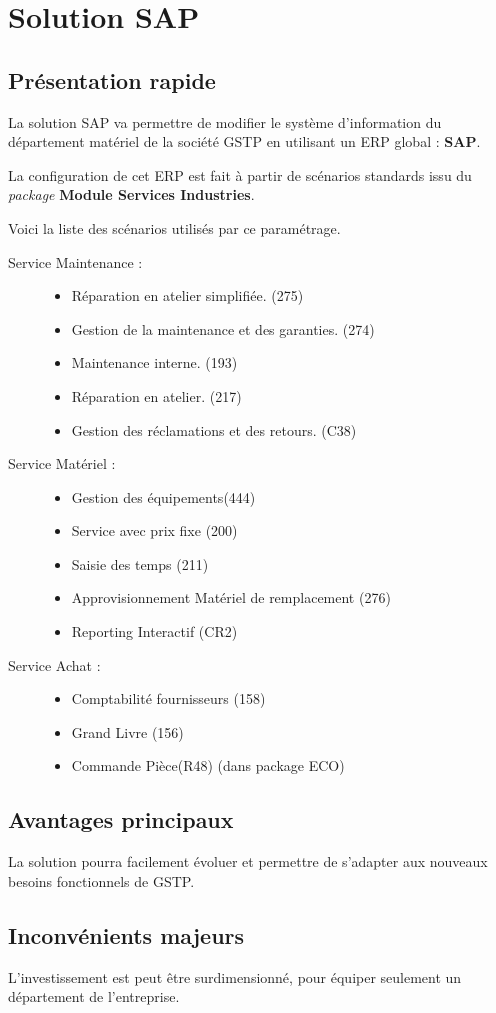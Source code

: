 \section{Solution SAP}

\subsection{Présentation rapide}

La solution SAP va permettre de modifier le système d'information du département
matériel de la société GSTP en utilisant un ERP global : {\bf SAP}.

La configuration de cet ERP est fait à partir de scénarios standards issu du {\sl package}
{\bf Module Services Industries}.

Voici la liste des scénarios utilisés par ce paramétrage.

\begin{description}
\item [Service Maintenance :]\el
\begin{itemize}
    \item Réparation en atelier simplifiée. (275)
    \item Gestion de la maintenance et des garanties. (274)
    \item Maintenance interne. (193)
    \item Réparation en atelier. (217)
    \item Gestion des réclamations et des retours. (C38)
\end{itemize}

\item [Service Matériel :]\el
\begin{itemize}
    \item Gestion des équipements(444)
    \item Service avec prix fixe (200)
    \item Saisie des temps (211)
    \item Approvisionnement Matériel de remplacement (276)
    \item Reporting Interactif (CR2)
\end{itemize}
\item [Service Achat :]\el
\begin{itemize}
    \item Comptabilité fournisseurs (158)
    \item Grand Livre (156)
    \item Commande Pièce(R48) (dans package ECO)
\end{itemize}
\end{description}
\subsection{Avantages principaux}

La solution pourra facilement évoluer et permettre de s'adapter aux nouveaux besoins
fonctionnels de GSTP.

\subsection{Inconvénients majeurs}

L'investissement est peut être surdimensionné, pour équiper seulement un département
de l'entreprise.
